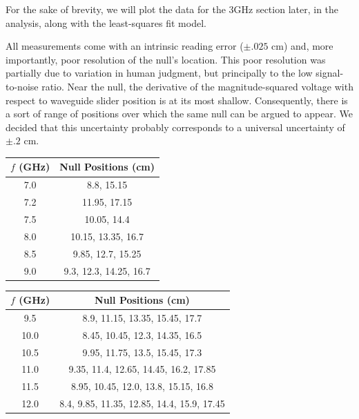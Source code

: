\documentclass[12pt]{article}
\begin{document}



For the sake of brevity, we will plot the data for the 3GHz section later, in the analysis, along with the least-squares fit model.

All measurements come with an intrinsic reading error ($\pm .025$ cm) and, more importantly, poor resolution of the null's location. This poor resolution was partially due to variation in human judgment, but principally to the low signal-to-noise ratio. Near the null, the derivative of the magnitude-squared voltage with respect to waveguide slider position is at its most shallow. Consequently, there is a sort of range of positions over which the same null can be argued to appear. We decided that this uncertainty probably corresponds to a universal uncertainty of $\pm .2$ cm.

\begin{center}
 \begin{tabular}{||c c||} 
 \hline
 $f$ (GHz) & Null Positions (cm)\\ [0.5ex] 
 \hline
 7.0 & 8.8, 15.15 \\ 
 \hline
 7.2 & 11.95, 17.15 \\
 \hline
 7.5 & 10.05, 14.4 \\ 
 \hline
 8.0 & 10.15, 13.35, 16.7 \\
 \hline
 8.5 & 9.85, 12.7, 15.25 \\
 \hline 
 9.0 & 9.3, 12.3, 14.25, 16.7 \\ [1ex] 
 \hline
\end{tabular}
 \begin{tabular}{||c c||} 
 \hline
 $f$ (GHz) & Null Positions (cm)\\ [0.5ex] 
 \hline
 9.5 & 8.9, 11.15, 13.35, 15.45, 17.7 \\ 
 \hline
 10.0 & 8.45, 10.45, 12.3, 14.35, 16.5 \\
 \hline
 10.5 & 9.95, 11.75, 13.5, 15.45, 17.3 \\
 \hline
 11.0 & 9.35, 11.4, 12.65, 14.45, 16.2, 17.85 \\
 \hline
 11.5 & 8.95, 10.45, 12.0, 13.8, 15.15, 16.8 \\
 \hline
 12.0 & 8.4, 9.85, 11.35, 12.85, 14.4, 15.9, 17.45 \\ [1ex] 
 \hline
\end{tabular}
\end{center}
\end{document}
